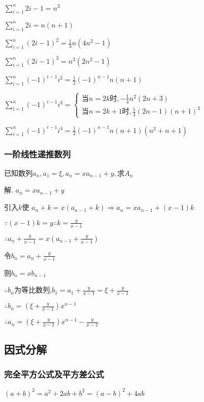 \documentclass[UTF8]{ctexart}
\begin{document}
$\displaystyle \sum_{i=1}^{n}2i-1=n^2 $

$\displaystyle \sum_{i=1}^{n}2i=n(n+1)$

$\displaystyle \sum_{i=1}^{n}(2i-1)^2=\frac{1}{3} n(4n^2-1)$

$\displaystyle \sum_{i=1}^{n}(2i-1)^3=n^2(2n^2-1)$

$\displaystyle \sum_{i=1}^{n}(-1)^{i-1}i^2=\frac{1}{2} (-1)^{n-1}n(n+1) $

$\displaystyle \sum_{i=1}^{n}(-1)^{i-1}i^3=
\begin{cases} \text {当}n=2k\text {时},-\frac{1}{4} n^2(2n+3)
 \\
\text {当}n=2k+1\text {时},\frac{1}{4} (2n-1)(n+1)^2
\end{cases}$

$\displaystyle \sum_{i=1}^{n}(-1)^{i-1}i^4=\frac{1}{2} (-1)^{n-1}n(n+1)(n^2+n+1)$

\subsubsection{一阶线性递推数列}

已知数列${a_{n}},a_{1}=\xi ,a_{n}=xa_{n-1}+y,$求$A_{n}$

解.
$a_{n}=xa_{n-1}+y$

引入$k$使 $a_{n}+k=x(a_{n-1}+k) \Rightarrow a_{n}=xa_{n-1}+(x-1)k$

$\because (x-1)k=y \therefore k=\frac{y}{x-1} $

$\therefore a_{n}+\frac{y}{x-1} =x(a_{n-1}+\frac{y}{x-1} )$

令$b_{n}=a_{n}+\frac{y}{x-1}$

则$b_{n}=xb_{n-1}$

$\therefore b_{n}$为等比数列,$b_{1}=a_{1}+\frac{y}{x-1} =\xi +\frac{y}{x-1} $

$\therefore b_{n}=(\xi +\frac{y}{x-1} )x^{n-1}$

$\therefore a_{n}=(\xi +\frac{y}{x-1} )x^{n-1}-\frac{y}{x-1}$

\subsection{因式分解}

\subsubsection{完全平方公式及平方差公式}

$\left(a+b\right)^2=a^2+2ab+b^2=(a-b)^2+4ab$
\end{document}
